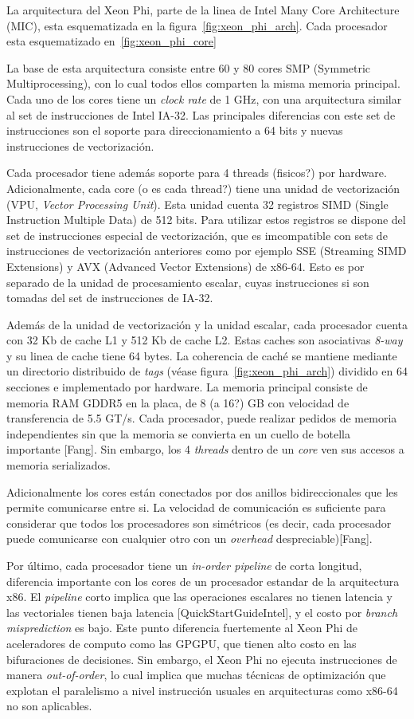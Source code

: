 La arquitectura del Xeon Phi, parte de la linea de Intel Many Core Architecture (MIC), esta esquematizada
en la figura~\ref{fig:xeon_phi_arch}. Cada procesador esta esquematizado en~\ref{fig:xeon_phi_core}

La base de esta arquitectura consiste entre 60 y 80 cores SMP (Symmetric Multiprocessing), con lo cual todos
ellos comparten la misma memoria principal. Cada uno de los cores tiene un \textit{clock rate} de 1 GHz,
con una arquitectura similar al set de instrucciones de Intel IA-32. Las principales diferencias con este
set de instrucciones son el soporte para direccionamiento a 64 bits y nuevas instrucciones de vectorización.

Cada procesador tiene además soporte para 4 threads (fisicos?) por hardware. Adicionalmente, cada core (o es cada thread?) tiene una unidad
de vectorización (VPU, \textit{Vector Processing Unit}). Esta unidad cuenta 32 registros SIMD (Single Instruction
Multiple Data) de 512 bits. Para utilizar estos registros se dispone del set de instrucciones especial de vectorización,
que es imcompatible con sets de instrucciones de vectorizaci\'on anteriores como por ejemplo SSE (Streaming SIMD Extensions) y AVX (Advanced
Vector Extensions) de x86-64. Esto es por separado de la unidad de procesamiento escalar, cuyas instrucciones si son tomadas del set de
instrucciones de IA-32.

Además de la unidad de vectorización y la unidad escalar, cada procesador cuenta con 32 Kb de cache L1 y 512 Kb de cache
L2. Estas caches son asociativas \textit{8-way} y su linea de cache tiene 64 bytes. La coherencia de caché se mantiene
mediante un directorio distribuido de \textit{tags} (véase figura~\ref{fig:xeon_phi_arch}) dividido en 64 secciones e implementado
por hardware. La memoria principal consiste de memoria RAM GDDR5 en la placa, de 8  (a 16?) GB con velocidad de transferencia de 5.5 GT/s.
Cada procesador, puede realizar pedidos de memoria independientes sin que la memoria se convierta en un cuello
de botella importante [Fang]. Sin embargo, los 4 \textit{threads} dentro de un \textit{core} ven sus accesos a memoria serializados.

Adicionalmente los cores están conectados por dos anillos bidireccionales que les permite comunicarse entre si. La velocidad de
comunicación es suficiente para considerar que todos los procesadores son simétricos (es decir, cada procesador puede comunicarse con
cualquier otro con un \textit{overhead} despreciable)[Fang].

Por último, cada procesador tiene un \textit{in-order pipeline} de corta longitud, diferencia importante con los cores de un procesador
estandar de la arquitectura x86. El \textit{pipeline} corto implica que las operaciones escalares no tienen latencia y las vectoriales tienen baja latencia [QuickStartGuideIntel],
y el costo por \textit{branch misprediction} es bajo. Este punto diferencia fuertemente al Xeon Phi de aceleradores de computo como las GPGPU, que tienen alto costo en las
bifuraciones de decisiones. Sin embargo, el Xeon Phi no ejecuta instrucciones de manera
\textit{out-of-order}, lo cual implica que muchas t\'ecnicas de optimizaci\'on que explotan el paralelismo a nivel instrucción usuales en arquitecturas como x86-64 no son
aplicables.

